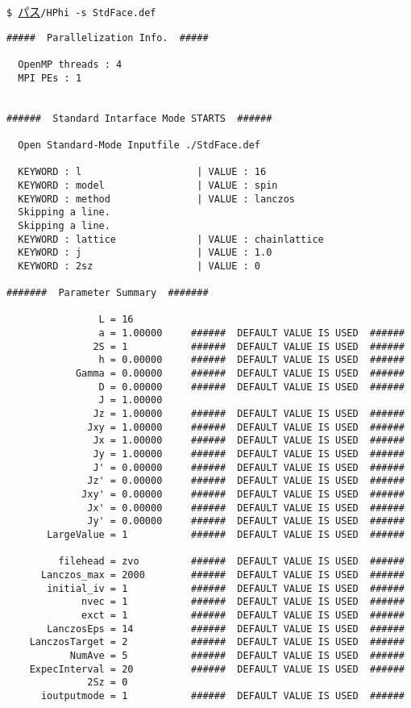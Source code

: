 \vspace{1cm}\hspace{-0.7cm}
\verb|$ |\underline{パス}\verb|/HPhi -s StdFace.def|
\small
\begin{verbatim}
#####  Parallelization Info.  #####

  OpenMP threads : 4
  MPI PEs : 1 


######  Standard Intarface Mode STARTS  ######

  Open Standard-Mode Inputfile ./StdFace.def 

  KEYWORD : l                    | VALUE : 16 
  KEYWORD : model                | VALUE : spin 
  KEYWORD : method               | VALUE : lanczos 
  Skipping a line.
  Skipping a line.
  KEYWORD : lattice              | VALUE : chainlattice 
  KEYWORD : j                    | VALUE : 1.0 
  KEYWORD : 2sz                  | VALUE : 0 

#######  Parameter Summary  #######

                L = 16 
                a = 1.00000     ######  DEFAULT VALUE IS USED  ######
               2S = 1           ######  DEFAULT VALUE IS USED  ######
                h = 0.00000     ######  DEFAULT VALUE IS USED  ######
            Gamma = 0.00000     ######  DEFAULT VALUE IS USED  ######
                D = 0.00000     ######  DEFAULT VALUE IS USED  ######
                J = 1.00000   
               Jz = 1.00000     ######  DEFAULT VALUE IS USED  ######
              Jxy = 1.00000     ######  DEFAULT VALUE IS USED  ######
               Jx = 1.00000     ######  DEFAULT VALUE IS USED  ######
               Jy = 1.00000     ######  DEFAULT VALUE IS USED  ######
               J' = 0.00000     ######  DEFAULT VALUE IS USED  ######
              Jz' = 0.00000     ######  DEFAULT VALUE IS USED  ######
             Jxy' = 0.00000     ######  DEFAULT VALUE IS USED  ######
              Jx' = 0.00000     ######  DEFAULT VALUE IS USED  ######
              Jy' = 0.00000     ######  DEFAULT VALUE IS USED  ######
       LargeValue = 1           ######  DEFAULT VALUE IS USED  ######

         filehead = zvo         ######  DEFAULT VALUE IS USED  ######
      Lanczos_max = 2000        ######  DEFAULT VALUE IS USED  ######
       initial_iv = 1           ######  DEFAULT VALUE IS USED  ######
             nvec = 1           ######  DEFAULT VALUE IS USED  ######
             exct = 1           ######  DEFAULT VALUE IS USED  ######
       LanczosEps = 14          ######  DEFAULT VALUE IS USED  ######
    LanczosTarget = 2           ######  DEFAULT VALUE IS USED  ######
           NumAve = 5           ######  DEFAULT VALUE IS USED  ######
    ExpecInterval = 20          ######  DEFAULT VALUE IS USED  ######
              2Sz = 0  
      ioutputmode = 1           ######  DEFAULT VALUE IS USED  ######


\end{verbatim}
